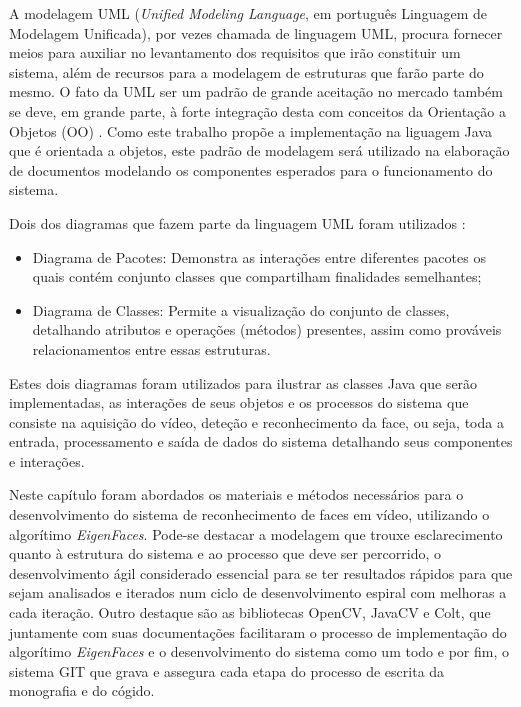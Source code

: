 A modelagem UML (\textit{Unified Modeling Language}, em português Linguagem de Modelagem Unificada), por vezes chamada de linguagem UML, procura fornecer meios para auxiliar no levantamento dos requisitos que irão constituir um sistema, além de recursos para a modelagem de estruturas que farão parte do mesmo. O fato da UML ser um padrão de grande aceitação no mercado também se deve, em grande parte, à forte integração desta com conceitos da Orientação a Objetos (OO) \cite{uml}. Como este trabalho propõe a implementação na liguagem Java que é orientada a objetos, este padrão de modelagem será utilizado na elaboração de documentos modelando os componentes esperados para o funcionamento do sistema.

Dois dos diagramas que fazem parte da linguagem UML foram utilizados \cite{uml}:


\begin{itemize}
	\item Diagrama de Pacotes: Demonstra as interações entre diferentes pacotes os quais contém conjunto classes que compartilham finalidades semelhantes;
	
	\item Diagrama de Classes: Permite a visualização do conjunto de classes, detalhando atributos e operações (métodos) presentes, assim como prováveis relacionamentos entre essas estruturas.

\end{itemize}

Estes dois diagramas foram utilizados para ilustrar as classes Java que serão implementadas, as interações de seus objetos e os processos do sistema que consiste na aquisição do vídeo, deteção e reconhecimento da face, ou seja, toda a entrada, processamento e saída de dados do sistema detalhando seus componentes e interações.


Neste capítulo foram abordados os materiais e métodos necessários para o desenvolvimento do sistema de reconhecimento de faces em vídeo, utilizando o algorítimo \textit{EigenFaces}. Pode-se destacar a modelagem que trouxe esclarecimento quanto à estrutura do sistema e ao processo que deve ser percorrido, o desenvolvimento ágil considerado essencial para se ter resultados rápidos para que sejam analisados e iterados num ciclo de desenvolvimento espiral com melhoras a cada iteração. Outro destaque são as bibliotecas OpenCV, JavaCV e Colt, que juntamente com suas documentações facilitaram o processo de implementação do algorítimo \textit{EigenFaces} e o desenvolvimento do sistema como um todo e por fim, o sistema GIT que grava e assegura cada etapa do processo de escrita da monografia e do cógido.







%





